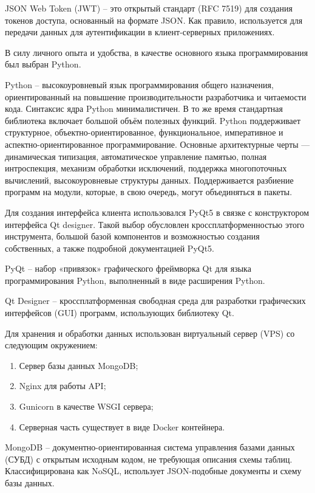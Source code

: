 \documentclass[14pt, a4paper]{extarticle}
\begin{document}
    JSON Web Token (JWT) – это открытый стандарт (RFC 7519) для создания токенов доступа, основанный на формате JSON. Как правило, используется для передачи данных для аутентификации в клиент-серверных приложениях.

    В силу личного опыта и удобства, в качестве основного языка программирования был выбран Python.

    Python – высокоуровневый язык программирования общего назначения, ориентированный на повышение производительности разработчика и читаемости кода. Синтаксис ядра Python минималистичен. В то же время стандартная библиотека включает большой объём полезных функций. Python поддерживает структурное, объектно-ориентированное, функциональное, императивное и аспектно-ориентированное программирование. Основные архитектурные черты — динамическая типизация, автоматическое управление памятью, полная интроспекция, механизм обработки исключений, поддержка многопоточных вычислений, высокоуровневые структуры данных. Поддерживается разбиение программ на модули, которые, в свою очередь, могут объединяться в пакеты.

    Для создания интерфейса клиента использовался PyQt5 в связке с конструктором интерфейса Qt designer. Такой выбор обусловлен кроссплатформенностью этого инструмента, большой базой компонентов и возможностью создания собственных, а также подробной документацией PyQt5.

    PyQt – набор «привязок» графического фреймворка Qt для языка программирования Python, выполненный в виде расширения Python.

    Qt Designer – кроссплатформенная свободная среда для разработки графических интерфейсов (GUI) программ, использующих библиотеку Qt.

    Для хранения и обработки данных использован виртуальный сервер (VPS) со следующим окружением:
    \begin{enumerate} 
        \item Сервер базы данных MongoDB;
        \item Nginx для работы API;
        \item Gunicorn в качестве WSGI сервера;
        \item Серверная часть существует в виде Docker контейнера.
    \end{enumerate}
    MongoDB – документно-ориентированная система управления базами данных (СУБД) с открытым исходным кодом, не требующая описания схемы таблиц. Классифицирована как NoSQL, использует JSON-подобные документы и схему базы данных.
\end{document}
